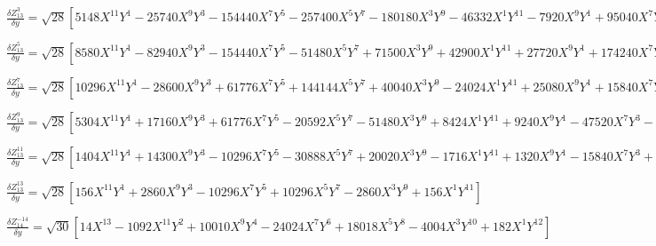 \documentclass[10pt,landscape]{article}
\begin{document}
\vspace{1.2 mm}
\noindent $ \frac{\delta Z^{3}_{13}}{\delta y} = \sqrt{28} [5148X^{11}Y^{1} -25740X^{9}Y^{3} -154440X^{7}Y^{5} -257400X^{5}Y^{7} -180180X^{3}Y^{9} -46332X^{1}Y^{11} -7920X^{9}Y^{1} +95040X^{7}Y^{3} +332640X^{5}Y^{5} +348480X^{3}Y^{7} +118800X^{1}Y^{9} -110880X^{5}Y^{3} -221760X^{3}Y^{5} -110880X^{1}Y^{7} +5040X^{5}Y^{1} +50400X^{3}Y^{3} +45360X^{1}Y^{5} -2520X^{3}Y^{1} -7560X^{1}Y^{3} +336X^{1}Y^{1}] $

\vspace{1.2 mm}
\noindent $ \frac{\delta Z^{5}_{13}}{\delta y} = \sqrt{28} [8580X^{11}Y^{1} -82940X^{9}Y^{3} -154440X^{7}Y^{5} -51480X^{5}Y^{7} +71500X^{3}Y^{9} +42900X^{1}Y^{11} +27720X^{9}Y^{1} +174240X^{7}Y^{3} +166320X^{5}Y^{5} -79200X^{3}Y^{7} -99000X^{1}Y^{9} -31680X^{7}Y^{1} -110880X^{5}Y^{3} +79200X^{1}Y^{7} +15120X^{5}Y^{1} +16800X^{3}Y^{3} -25200X^{1}Y^{5} -2520X^{3}Y^{1} +2520X^{1}Y^{3}] $

\vspace{1.2 mm}
\noindent $ \frac{\delta Z^{7}_{13}}{\delta y} = \sqrt{28} [10296X^{11}Y^{1} -28600X^{9}Y^{3} +61776X^{7}Y^{5} +144144X^{5}Y^{7} +40040X^{3}Y^{9} -24024X^{1}Y^{11} +25080X^{9}Y^{1} +15840X^{7}Y^{3} -166320X^{5}Y^{5} -110880X^{3}Y^{7} +46200X^{1}Y^{9} -19800X^{7}Y^{1} +27720X^{5}Y^{3} +83160X^{3}Y^{5} -27720X^{1}Y^{7} +5040X^{5}Y^{1} -16800X^{3}Y^{3} +5040X^{1}Y^{5}] $

\vspace{1.2 mm}
\noindent $ \frac{\delta Z^{9}_{13}}{\delta y} = \sqrt{28} [5304X^{11}Y^{1} +17160X^{9}Y^{3} +61776X^{7}Y^{5} -20592X^{5}Y^{7} -51480X^{3}Y^{9} +8424X^{1}Y^{11} +9240X^{9}Y^{1} -47520X^{7}Y^{3} -33264X^{5}Y^{5} +79200X^{3}Y^{7} -11880X^{1}Y^{9} -3960X^{7}Y^{1} +27720X^{5}Y^{3} -27720X^{3}Y^{5} +3960X^{1}Y^{7}] $

\vspace{1.2 mm}
\noindent $ \frac{\delta Z^{11}_{13}}{\delta y} = \sqrt{28} [1404X^{11}Y^{1} +14300X^{9}Y^{3} -10296X^{7}Y^{5} -30888X^{5}Y^{7} +20020X^{3}Y^{9} -1716X^{1}Y^{11} +1320X^{9}Y^{1} -15840X^{7}Y^{3} +33264X^{5}Y^{5} -15840X^{3}Y^{7} +1320X^{1}Y^{9}] $

\vspace{1.2 mm}
\noindent $ \frac{\delta Z^{13}_{13}}{\delta y} = \sqrt{28} [156X^{11}Y^{1} +2860X^{9}Y^{3} -10296X^{7}Y^{5} +10296X^{5}Y^{7} -2860X^{3}Y^{9} +156X^{1}Y^{11}] $

\vspace{1.2 mm}
\noindent $ \frac{\delta Z^{-14}_{14}}{\delta y} = \sqrt{30} [14X^{13} -1092X^{11}Y^{2} +10010X^{9}Y^{4} -24024X^{7}Y^{6} +18018X^{5}Y^{8} -4004X^{3}Y^{10} +182X^{1}Y^{12}] $
\end{document}
